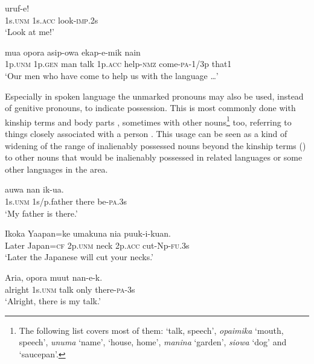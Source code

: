 \ea%
\label{ex:3:x535}
\gll {}  uruf-e! \\
1s.\textsc{unm} 1s.\textsc{acc} look-\textsc{imp}.2s\\
\glt`Look at me!'
\z

\ea%
\label{ex:3:x536}
\gll {}  mua opora  asip-owa ekap-e-mik nain \\
1p.\textsc{unm} 1p.\textsc{gen} man talk 1p.\textsc{acc} help-\textsc{nmz} come-\textsc{pa}-1/3p that1\\
\glt`Our men who have come to help us with the language {\dots}'
\z

Especially in spoken language the unmarked pronouns may also be used, instead of genitive pronouns, to indicate possession. This is most commonly done with kinship terms  and body parts , sometimes with other nouns\footnote{The following list covers most of them:  `talk, speech', \textit{opaimika} `mouth, speech', \textit{unuma} `name',  `house, home', \textit{manina} `garden', \textit{siowa} `dog' and  `saucepan'.} too, referring to things closely associated with a person . This usage can be seen as a kind of widening of the range of inalienably possessed nouns beyond the kinship terms () to other nouns that would be inalienably possessed in related languages or some other languages in the area. 

\ea%
\label{ex:3:x537}
\gll {} auwa nan ik-ua. \\
1s.\textsc{unm} 1s/p.father there be-\textsc{pa}.3s\\
\glt`My father is there.'
\z

\ea%
\label{ex:3:x538}
\gll Ikoka Yaapan=ke   umakuna nia puuk-i-kuan. \\
Later Japan=\textsc{cf} 2p.\textsc{unm} neck 2p.\textsc{acc} cut-Np-\textsc{fu}.3s\\
\glt`Later the Japanese will cut your necks.'
\z

\ea%
\label{ex:3:x1804}
\gll Aria,  opora muut nan-e-k. \\
alright 1s.\textsc{unm} talk only there-\textsc{pa}-3s\\
\glt`Alright, there is my talk.'
\z

